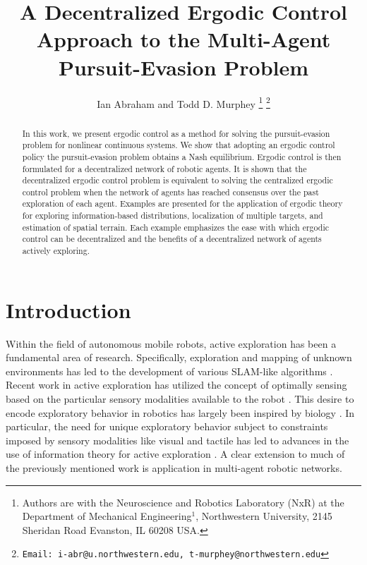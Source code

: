 \documentclass[letterpaper, 10 pt,  conference, twoside]{IEEEtran/IEEEtran}
\theoremstyle{definition}
\begin{document}
\title{A Decentralized Ergodic Control Approach to the Multi-Agent Pursuit-Evasion Problem}

\author{Ian Abraham and Todd D. Murphey
\thanks{Authors are with the Neuroscience and Robotics Laboratory (NxR) at the Department of Mechanical Engineering$^{1}$, Northwestern University, 2145 Sheridan Road Evanston, IL 60208 USA.}
\thanks{{\tt\small Email: i-abr@u.northwestern.edu, t-murphey@northwestern.edu}}
}
\maketitle

\begin{abstract}
In this work, we present ergodic control as a method for solving the pursuit-evasion problem for nonlinear continuous systems.
We show that adopting an ergodic control policy the pursuit-evasion problem obtains a Nash equilibrium.
Ergodic control is then formulated for a decentralized network of robotic agents. It is shown that the decentralized ergodic control problem is equivalent to solving the centralized ergodic control problem when the network of agents has reached consensus over the past exploration of each agent. Examples are presented for the application of ergodic theory for exploring information-based distributions, localization of multiple targets, and estimation of spatial terrain. Each example emphasizes the ease with which ergodic control can be decentralized and the benefits of a decentralized network of agents actively exploring.
\end{abstract}

\section{Introduction}

Within the field of autonomous mobile robots, active exploration has been a fundamental area of research. Specifically, exploration and mapping of unknown environments has led to the development of various SLAM-like algorithms \cite{bailey2006simultaneous, durrant2006simultaneous, choset2001topological}. Recent work in active exploration has utilized the concept of optimally sensing based on the particular sensory modalities available to the robot \cite{abraham2017ergodic, de2016ergodic, miller2016ergodic, yang2013human, ts_ref_1}. This desire to encode exploratory behavior in robotics has largely been inspired by biology \cite{iida2016biologically, zhu2015bioinspired}. In particular, the need for unique exploratory behavior subject to constraints imposed by sensory modalities like visual and tactile has led to advances in the use of information theory for active exploration \cite{abraham2017ergodic, miller2016ergodic, mihaylova2002comparison, ryan2010particle}. A clear extension to much of the previously mentioned work is application in multi-agent robotic networks.
\end{document}
